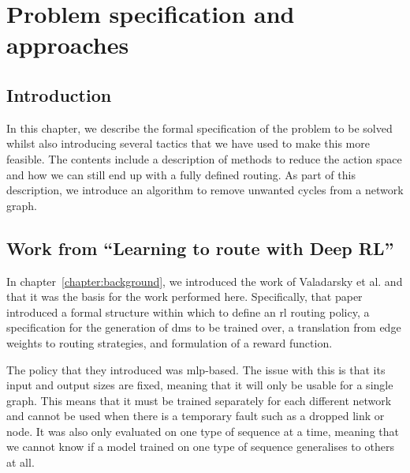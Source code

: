 \chapter{Problem specification and approaches}
\label{chapter:problem}

\section{Introduction}
In this chapter, we describe the formal specification of the problem to be solved whilst also introducing several tactics that we have used to make this more feasible. The contents include a description of methods to reduce the action space and how we can still end up with a fully defined routing. As part of this description, we introduce an algorithm to remove unwanted cycles from a network graph.

\section{Work from \enquote{Learning to route with Deep RL}}
In chapter~\ref{chapter:background}, we introduced the work of Valadarsky et al.\cite{valadarsky2017learning} and that it was the basis for the work performed here. Specifically, that paper introduced a formal structure within which to define an \ac{rl} routing policy, a specification for the generation of \acp{dm} to be trained over, a translation from edge weights to routing strategies, and formulation of a reward function.

The policy that they introduced was \ac{mlp}-based. The issue with this is that its input and output sizes are fixed, meaning that it will only be usable for a single graph. This means that it must be trained separately for each different network and cannot be used when there is a temporary fault such as a dropped link or node. It was also only evaluated on one type of sequence at a time, meaning that we cannot know if a model trained on one type of sequence generalises to others at all.


